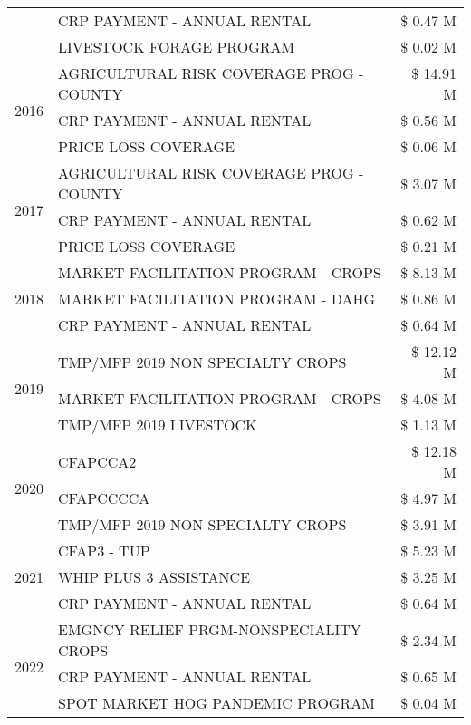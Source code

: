 \begin{tabular}{llr}
 & CRP PAYMENT - ANNUAL RENTAL & \$ 0.47 M \\
 & LIVESTOCK FORAGE PROGRAM & \$ 0.02 M \\
\cline{1-3}
\multirow[t]{3}{*}{2016} & AGRICULTURAL RISK COVERAGE PROG - COUNTY & \$ 14.91 M \\
 & CRP PAYMENT - ANNUAL RENTAL & \$ 0.56 M \\
 & PRICE LOSS COVERAGE & \$ 0.06 M \\
\cline{1-3}
\multirow[t]{3}{*}{2017} & AGRICULTURAL RISK COVERAGE PROG - COUNTY & \$ 3.07 M \\
 & CRP PAYMENT - ANNUAL RENTAL & \$ 0.62 M \\
 & PRICE LOSS COVERAGE & \$ 0.21 M \\
\cline{1-3}
\multirow[t]{3}{*}{2018} & MARKET FACILITATION PROGRAM - CROPS & \$ 8.13 M \\
 & MARKET FACILITATION PROGRAM - DAHG & \$ 0.86 M \\
 & CRP PAYMENT - ANNUAL RENTAL & \$ 0.64 M \\
\cline{1-3}
\multirow[t]{3}{*}{2019} & TMP/MFP 2019 NON SPECIALTY CROPS & \$ 12.12 M \\
 & MARKET FACILITATION PROGRAM - CROPS & \$ 4.08 M \\
 & TMP/MFP 2019 LIVESTOCK & \$ 1.13 M \\
\cline{1-3}
\multirow[t]{3}{*}{2020} & CFAPCCA2 & \$ 12.18 M \\
 & CFAPCCCCA & \$ 4.97 M \\
 & TMP/MFP 2019 NON SPECIALTY CROPS & \$ 3.91 M \\
\cline{1-3}
\multirow[t]{3}{*}{2021} & CFAP3 - TUP & \$ 5.23 M \\
 & WHIP PLUS 3 ASSISTANCE & \$ 3.25 M \\
 & CRP PAYMENT - ANNUAL RENTAL & \$ 0.64 M \\
\cline{1-3}
\multirow[t]{3}{*}{2022} & EMGNCY RELIEF PRGM-NONSPECIALITY CROPS & \$ 2.34 M \\
 & CRP PAYMENT - ANNUAL RENTAL & \$ 0.65 M \\
 & SPOT MARKET HOG PANDEMIC PROGRAM & \$ 0.04 M \\
\cline{1-3}
\bottomrule
\end{tabular}
